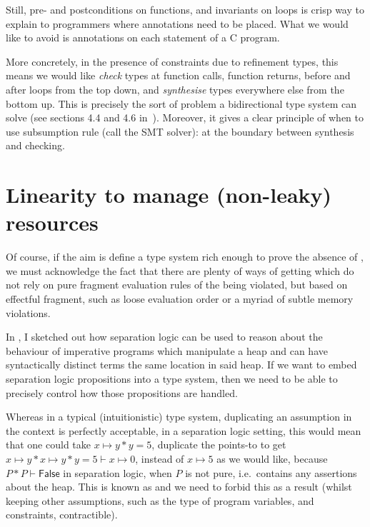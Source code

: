 Still, pre- and postconditions on functions, and invariants on loops is crisp
way to explain to programmers where annotations need to be placed. What we
would like to avoid is annotations on each statement of a C program.

More concretely, in the presence of constraints due to refinement types, this
means we would like \emph{check} types at function calls, function returns,
before and after loops from the top down, and \emph{synthesise} types
everywhere else from the bottom up. This is precisely the sort of problem a
bidirectional type system can solve (see sections 4.4 and 4.6
in~). Moreover, it gives a clear principle of
when to use subsumption rule (call the SMT solver): at the boundary between
synthesis and checking.

\section{Linearity to manage (non-leaky) resources}

Of course, if the aim is define a type system rich enough to prove the absence
of , we must acknowledge the fact that there are plenty of ways of
getting  which do not rely on pure fragment evaluation rules of the
 being violated, but based on effectful fragment, such as loose
evaluation order or a myriad of subtle memory violations.

In , I sketched out how separation logic can be
used to reason about the behaviour of imperative programs which manipulate a
heap and can have syntactically distinct terms  the same location
in said heap. If we want to embed separation logic propositions into a type
system, then we need to be able to precisely control how those propositions are
handled.

Whereas in a typical (intuitionistic) type system, duplicating an assumption in
the context is perfectly acceptable, in a separation logic setting, this would
mean that one could take $x \mapsto{} y \ast{} y = 5$, duplicate the points-to
to get $x \mapsto{} y \ast{} x \mapsto{} y \ast y = 5 \vdash{} x \mapsto{} 0$,
instead of $x \mapsto{} 5$ as we would like, because $P \ast{} P \vdash{}
\mathsf{False}$ in separation logic, when $P$ is not pure, i.e.\ contains any
assertions about the heap. This is known as  and we need to
forbid this as a result (whilst keeping other assumptions, such as the type of
 program variables, and constraints, contractible).

